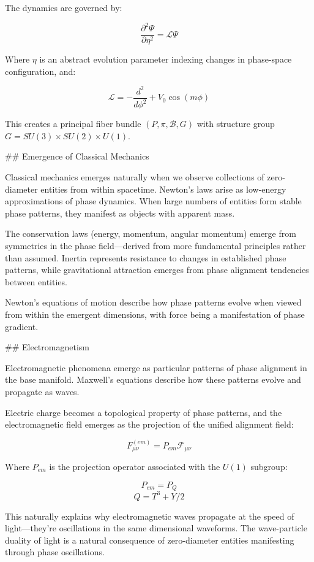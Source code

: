 The dynamics are governed by:

$$\frac{\partial^2\Psi}{\partial\eta^2} = \mathcal{L}\Psi$$

Where $\eta$ is an abstract evolution parameter indexing changes in phase-space configuration, and:

$$\mathcal{L} = -\frac{d^2}{d\phi^2} + V_0 \cos(m\phi)$$

This creates a principal fiber bundle $(P, \pi, \mathcal{B}, G)$ with structure group $G = SU(3) \times SU(2) \times U(1)$.

## Emergence of Classical Mechanics

Classical mechanics emerges naturally when we observe collections of zero-diameter entities from within spacetime. Newton's laws arise as low-energy approximations of phase dynamics. When large numbers of entities form stable phase patterns, they manifest as objects with apparent mass.

The conservation laws (energy, momentum, angular momentum) emerge from symmetries in the phase field—derived from more fundamental principles rather than assumed. Inertia represents resistance to changes in established phase patterns, while gravitational attraction emerges from phase alignment tendencies between entities.

Newton's equations of motion describe how phase patterns evolve when viewed from within the emergent dimensions, with force being a manifestation of phase gradient.

## Electromagnetism

Electromagnetic phenomena emerge as particular patterns of phase alignment in the base manifold. Maxwell's equations describe how these patterns evolve and propagate as waves.

Electric charge becomes a topological property of phase patterns, and the electromagnetic field emerges as the projection of the unified alignment field:

$$F_{\mu\nu}^{(em)} = P_{em}\mathcal{F}_{\mu\nu}$$

Where $P_{em}$ is the projection operator associated with the $U(1)$ subgroup:

$$P_{em} = P_{Q}$$ 
$$Q = T^3 + Y/2$$

This naturally explains why electromagnetic waves propagate at the speed of light—they're oscillations in the same dimensional waveforms. The wave-particle duality of light is a natural consequence of zero-diameter entities manifesting through phase oscillations.

